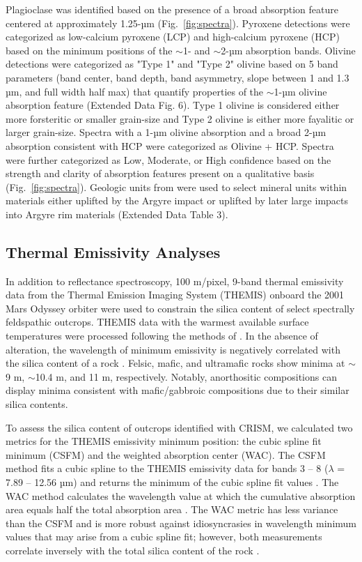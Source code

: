 \documentclass[12pt]{article}
\begin{document}
Plagioclase was identified based on the presence of a broad absorption feature centered at approximately 1.25-µm (Fig.~\ref{fig:spectra}). Pyroxene detections were categorized as low-calcium pyroxene (LCP) and high-calcium pyroxene (HCP) based on the minimum positions of the $\sim$1- and $\sim$2-µm absorption bands. Olivine detections were categorized as "Type 1" and "Type 2" olivine \citep{Ody2013} based on 5 band parameters (band center, band depth, band asymmetry, slope between 1 and 1.3 µm, and full width half max) that quantify properties of the $\sim$1-µm olivine absorption feature (Extended Data Fig. 6). Type 1 olivine is considered either more forsteritic or smaller grain-size and Type 2 olivine is either more fayalitic or larger grain-size. Spectra with a 1-µm olivine absorption and a broad 2-µm absorption consistent with HCP were categorized as Olivine + HCP. Spectra were further categorized as Low, Moderate, or High confidence based on the strength and clarity of absorption features present on a qualitative basis (Fig.~\ref{fig:spectra}). Geologic units from \citet{Dohm2015} were used to select mineral units within materials either uplifted by the Argyre impact or uplifted by later large impacts into Argyre rim materials (Extended Data Table 3).

\subsection*{Thermal Emissivity Analyses}

In addition to reflectance spectroscopy, 100 m/pixel, 9-band thermal emissivity data from the Thermal Emission Imaging System (THEMIS) onboard the 2001 Mars Odyssey orbiter \citep{Christensen2004} were used to constrain the silica content of select spectrally feldspathic outcrops. THEMIS data with the warmest available surface temperatures were processed following the methods of \citet{Bandfield2004}. In the absence of alteration, the wavelength of minimum emissivity is negatively correlated with the silica content of a rock \citep{Lyon1965}. Felsic, mafic, and ultramafic rocks show minima at $\sim$9 \textmu m, $\sim$10.4 \textmu m, and 11 \textmu m, respectively. Notably, anorthositic compositions can display minima consistent with mafic/gabbroic compositions due to their similar silica contents.

To assess the silica content of outcrops identified with CRISM, we calculated two metrics for the THEMIS emissivity minimum position: the cubic spline fit minimum (CSFM) and the weighted absorption center (WAC). The CSFM method fits a cubic spline to the THEMIS emissivity data for bands 3 -- 8 ($\lambda$ = 7.89 -- 12.56 µm) and returns the minimum of the cubic spline fit values \citep{Rogers2015}. The WAC method calculates the wavelength value at which the cumulative absorption area equals half the total absorption area \citep{Vincent1972, Smith2013, Amador2016}. The WAC metric has less variance than the CSFM and is more robust against idiosyncrasies in wavelength minimum values that may arise from a cubic spline fit; however, both measurements correlate inversely with the total silica content of the rock \citep{Vincent1972, Walter1989, Rogers2015, Amador2016}.
\end{document}
